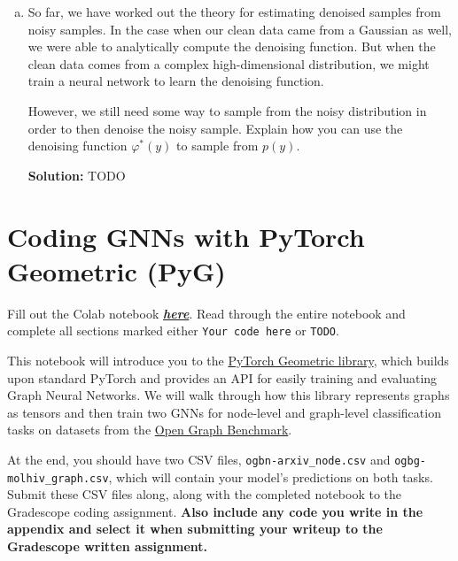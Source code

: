 \documentclass{article}
\newcommand{\Question}[1]{\Large \section{ #1 } \normalsize}
\newenvironment{solution}{\color{blue} \smallskip \textbf{Solution:}}{}
\begin{document}
\begin{enumerate}[(a)]
\begin{enumerate}[1.]
\item Compute $\varphi^{*}(y)$ in this specific case.

\begin{solution}
TODO
\end{solution}

\item Explain why this formula for $\varphi^{*}(y)$ makes sense.

\begin{solution}
TODO
\end{solution}
\end{enumerate}

\clearpage
\item So far, we have worked out the theory for estimating denoised samples from noisy samples. In the case when our clean data came from a Gaussian as well, we were able to analytically compute the denoising function. But when the clean data comes from a complex high-dimensional distribution, we might train a neural network to learn the denoising function.

However, we still need some way to sample from the noisy distribution in order to then denoise the noisy sample. Explain how you can use the denoising function $\varphi^{*}(y)$ to sample from $p(y)$.

\begin{solution}
TODO
\end{solution}
\end{enumerate}

\newpage
\Question{Coding GNNs with PyTorch Geometric (PyG)}

Fill out the Colab notebook \href{https://colab.research.google.com/drive/1ndSPX0boNURGcJMOMxWIgthsltBQ0gqM#scrollTo=8gzsP50bF6Gb}{\emph{\textbf{here}}}. Read through the entire notebook and complete all sections marked either \texttt{Your code here} or \texttt{TODO}.

This notebook will introduce you to the \href{https://pytorch-geometric.readthedocs.io}{PyTorch Geometric library}, which builds upon standard PyTorch and provides an API for easily training and evaluating Graph Neural Networks. We will walk through how this library represents graphs as tensors and then train two GNNs for node-level and graph-level classification tasks on datasets from the \href{https://ogb.stanford.edu}{Open Graph Benchmark}.

At the end, you should have two CSV files, \texttt{ogbn-arxiv\_node.csv} and \texttt{ogbg-molhiv\_graph.csv}, which will contain your model's predictions on both tasks. Submit these CSV files along, along with the completed notebook to the Gradescope coding assignment. \textbf{Also include any code you write in the appendix and select it when submitting your writeup to the Gradescope written assignment.}
\end{document}
